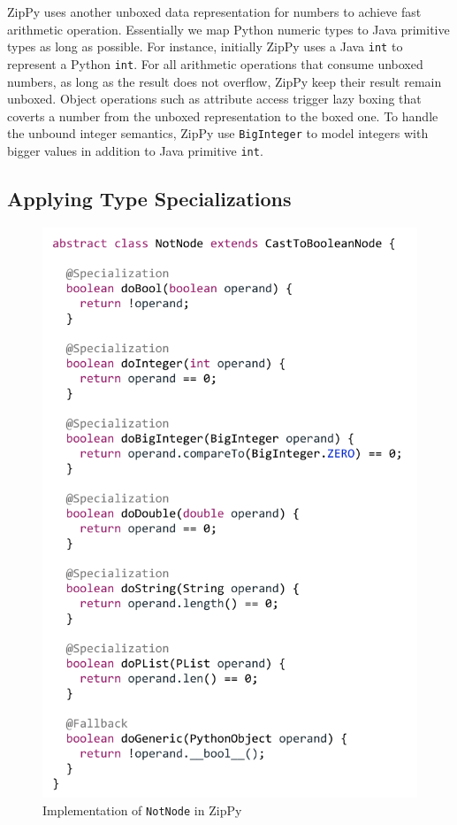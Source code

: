 ZipPy uses another unboxed data representation for numbers to achieve fast arithmetic operation.
Essentially we map Python numeric types to Java primitive types as long as possible.
For instance, initially ZipPy uses a Java \texttt{int} to represent a Python \texttt{int}.
For all arithmetic operations that consume unboxed numbers, as long as the result does not overflow, ZipPy keep their result remain unboxed.
Object operations such as attribute access trigger lazy boxing that coverts a number from the unboxed representation to the boxed one.
To handle the unbound integer semantics, ZipPy use \texttt{BigInteger} to model integers with bigger values in addition to Java primitive \texttt{int}.

\subsection{Applying Type Specializations}

\begin{figure}[t]
\centering
\includegraphics[scale=.9]{figures/ch3-not-node-code.pdf}
\caption{Implementation of \texttt{NotNode} in ZipPy}
\label{fig:not-node-code}
\end{figure}

